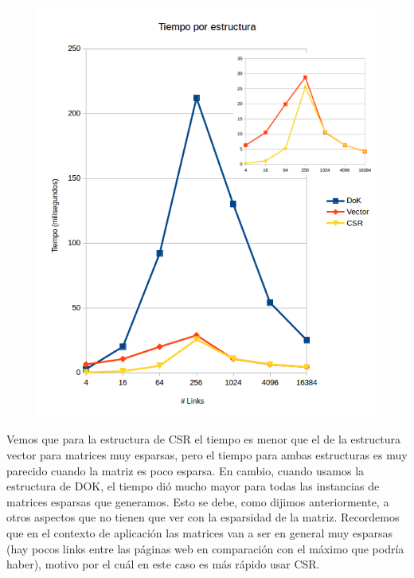 \begin{figure}
  \vspace{-20pt}
  \begin{center}
    \includegraphics[scale=0.4]{imagenes/MedicionTiempoEstructura.png}
  \end{center}
  \vspace{-20pt}
  \vspace{-10pt}
  \label{fig:img8}
\end{figure}

Vemos que para la estructura de CSR el tiempo es menor que el de la estructura vector para matrices muy esparsas, pero el tiempo para ambas estructuras es muy parecido cuando la matriz es poco esparsa. En cambio, cuando usamos la estructura de DOK, el tiempo dió mucho mayor para todas las instancias de matrices esparsas que generamos. Esto se debe, como dijimos anteriormente, a otros aspectos que no tienen que ver con la esparsidad de la matriz. Recordemos que en el contexto de aplicación las matrices van a ser en general muy esparsas (hay pocos links entre las páginas web en comparación con el máximo que podría haber), motivo por el cuál en este caso es más rápido usar CSR.\\ 

